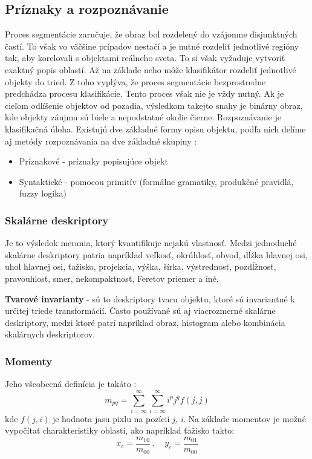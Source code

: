 \subsection{Príznaky a rozpoznávanie}
Proces segmentácie zaručuje, že obraz bol rozdelený do vzájomne disjunktných častí. To však vo väčšine prípadov nestačí a je nutné rozdeliť jednotlivé regióny tak, aby korelovali s objektami reálneho sveta. To si však vyžaduje vytvoriť exaktný popis oblastí. Až na základe neho môže klasifikátor rozdeliť jednotlivé objekty do tried. Z toho vyplýva, že proces segmentácie bezprostredne predchádza procesu klasifikácie. Tento proces však nie je vždy nutný. Ak je cieľom odlíšenie objektov od pozadia, výsledkom takejto snahy je binárny obraz, kde objekty záujmu sú biele a nepodstatné okolie čierne.
Rozpoznávanie je klasifikačná úloha. Existujú dve základné formy opisu objektu, podľa nich delíme aj metódy rozpoznávania na dve základné skupiny \cite{Analysis_and_Machine_Vision}:

\begin{itemize}
    \item Príznakové - príznaky popisujúce objekt 
    \item Syntaktické - pomocou primitív (formálne gramatiky, produkčné pravidlá, fuzzy logika)
\end{itemize}

\subsubsection{Skalárne deskriptory}
Je to výsledok merania, ktorý kvantifikuje nejakú vlastnosť. Medzi jednoduché skalárne deskriptory patria napríklad veľkosť, okrúhlosť, obvod, dĺžka hlavnej osi, uhol hlavnej osi, ťažisko, projekcia, výška, šírka, výstrednosť, pozdĺžnosť, pravouhlosť, smer, nekompaktnosť, Feretov priemer a iné. \cite{Analysis_and_Machine_Vision} 

\textbf{Tvarové invarianty} - sú to deskriptory tvaru objektu, ktoré sú invariantné k určitej triede transformácií.
Často používané sú aj viacrozmerné skalárne deskriptory, medzi ktoré patrí napríklad obraz, histogram alebo kombinácia skalárnych deskriptorov. \cite{Analysis_and_Machine_Vision} 

\subsubsection{Momenty}

Jeho všeobecná definícia je takáto \cite{pocitacove_videnie_v_praxi}: 
\begin{equation}
    m_{pq}=\sum_{i=\infty}^\infty \sum_{i=\infty}^\infty i^p j^q f(j,j)
\end{equation}
kde $f(j,i)$ je hodnota jasu pixlu na pozícii \textit{j, i}.
Na základe momentov je možné vypočítať charakteristiky oblastí, ako napríklad ťažisko takto: 
\begin{equation}
    x_c=\frac{m_{10}}{m_{00}}\ {,}\quad y_c=\frac{m_{01}}{m_{00}}
\end{equation}

